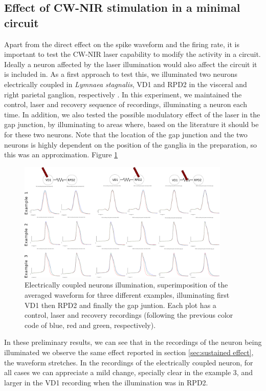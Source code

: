 \subsection{Effect of CW-NIR stimulation in a minimal circuit}
Apart from the direct effect on the spike waveform and the firing rate, it is important to test the CW-NIR laser capability to modify the activity in a circuit. Ideally a neuron affected by the laser illumination would also affect the circuit it is included in. As a first approach to test this, we illuminated two neurons electrically coupled in \textit{Lymnaea stagnalis}, VD1 and RPD2 in the visceral and right parietal ganglion, respectively \parencite{benjamin_electrotonic_1986,beekharry_role_2015}. In this experiment, we maintained the control, laser and recovery sequence of recordings, illuminating a neuron each time. In addition, we also tested the possible modulatory effect of the laser in the gap junction, by illuminating to areas where, based on the literature it should be for these two neurons. Note that the location of the gap junction and the two neurons is highly dependent on the position of the ganglia in the preparation, so this was an approximation. Figure \ref{fig:electrical results}

\begin{figure}[hbt]
	\centering
	\includegraphics[width=0.9\textwidth]{img/laser/electrical/electrical_results_reduced.pdf}
    \caption{Electrically coupled neurons illumination, superimposition of the averaged waveform for three different examples, illuminating first VD1 then RPD2 and finally the gap juntion. Each plot has a control, laser and recovery recordings (following the previous color code of blue, red and green, respectively).}
    \label{fig:electrical results}
\end{figure}
In these preliminary results, we can see that in the recordings of the neuron being illuminated we observe the same effect reported in section \ref{sec:sustained effect}, the waveform stretches. In the recordings of the electrically coupled neuron, for all cases we can appreciate a mild change, specially clear in the example 3, and larger in the VD1 recording when the illumination was in RPD2.

